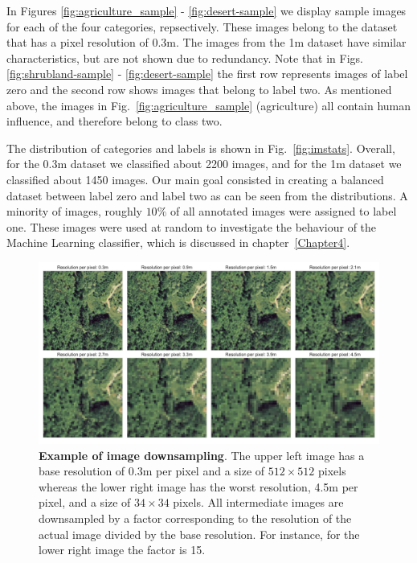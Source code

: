In Figures \ref{fig:agriculture_sample} - \ref{fig:desert-sample} we display sample images for each of the four categories, repsectively. These images belong to the dataset that has a pixel resolution of 0.3m. The images from the 1m dataset have similar characteristics, but are not shown due to redundancy. Note that in Figs. \ref{fig:shrubland-sample} - \ref{fig:desert-sample} the first row represents images of label zero and the second row shows images that belong to label two. As mentioned above, the images in Fig.~\ref{fig:agriculture_sample} (agriculture) all contain human influence, and therefore belong to class two. 

The distribution of categories and labels is shown in Fig.~\ref{fig:imstats}. Overall, for the 0.3m dataset we classified about 2200 images, and for the 1m dataset we classified about 1450 images. Our main goal consisted in creating a balanced dataset between label zero and label two as can be seen from the distributions. A minority of images, roughly $10\%$ of all annotated images were assigned to label one. These images were used at random to investigate the behaviour of the Machine Learning classifier, which is discussed in chapter~\ref{Chapter4}.

\begin{figure}[h!]
	\centering
	\captionsetup{width=1\linewidth}
	\includegraphics[width=1\textwidth]{Figures/demo_degrade.pdf}
	\caption{\textbf{Example of image downsampling}. The upper left image has a base resolution of 0.3m per pixel and a size of $512\times512$ pixels whereas the lower right image has the worst resolution, 4.5m per pixel, and a size of $34\times34$ pixels. All intermediate images are downsampled by a factor corresponding to the resolution of the actual image divided by the base resolution. For instance, for the lower right image the factor is 15.}
	\label{fig:degrade}
\end{figure}

